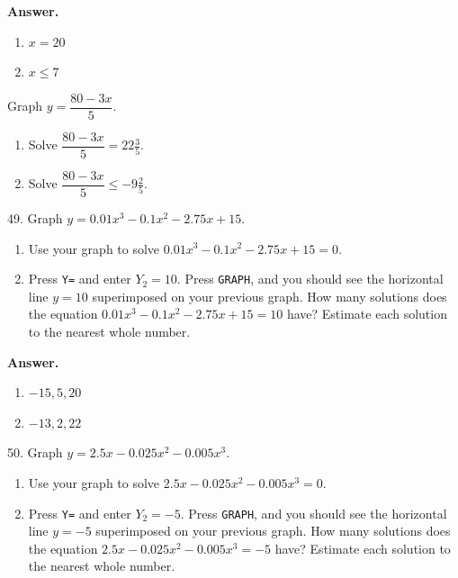 \documentclass[10pt,]{book}
\theoremstyle{plain}
\theoremstyle{definition}
\theoremstyle{definition}
\theoremstyle{definition}
\theoremstyle{definition}
\numberwithin{equation}{part}
\begin{document}
\begin{exerciselist}
\begin{exercisegroup}
%
\par\smallskip
\noindent\textbf{Answer.}\hypertarget{answer-116}{}\quad
\leavevmode%
\begin{multicols}{2}
\begin{enumerate}[label=*\alph**]
\item\hypertarget{li-871}{}\(x = 20 \)%
\item\hypertarget{li-872}{}\(x\le 7 \)%
\end{enumerate}
\end{multicols}
%
\exercise[48.]\hypertarget{exercise-205}{}Graph \(y = \dfrac{80 - 3x}{5}\). \leavevmode%
\begin{enumerate}[label=*\alph**]
\item\hypertarget{li-873}{}Solve \(\dfrac{80 - 3x}{5} = 22\frac{3}{5} \).%
\item\hypertarget{li-874}{}Solve \(\dfrac{80 - 3x}{5}\le -9\frac{2}{5} \).%
\end{enumerate}
%
\end{exercisegroup}
\par\smallskip\noindent
\item[49.]\hypertarget{exercise-206}{}Graph \(y = 0.01x^3 - 0.1x^2 - 2.75x + 15\). \leavevmode%
\begin{enumerate}[label=*\alph**]
\item\hypertarget{li-875}{}Use your graph to solve \(0.01x^3 - 0.1x^2 - 2.75x + 15 = 0\).%
\item\hypertarget{li-876}{}Press \lstinline?Y=? and enter \(Y_2 = 10\). Press \lstinline?GRAPH?, and you should see the horizontal line \(y = 10\) superimposed on your previous graph. How many solutions does the equation \(0.01x^3 - 0.1x^2 - 2.75x + 15 = 10\) have? Estimate each solution to the nearest whole number.%
\end{enumerate}
%
\par\smallskip
\par\smallskip
\noindent\textbf{Answer.}\hypertarget{answer-117}{}\quad
\leavevmode%
\begin{multicols}{2}
\begin{enumerate}[label=*\alph**]
\item\hypertarget{li-877}{}\(-15, 5, 20 \)%
\item\hypertarget{li-878}{}\(-13, 2, 22 \)%
\end{enumerate}
\end{multicols}
%
\item[50.]\hypertarget{exercise-207}{}Graph \(y = 2.5x - 0.025x^2 - 0.005x^3\). \leavevmode%
\begin{enumerate}[label=*\alph**]
\item\hypertarget{li-879}{}Use your graph to solve \(2.5x - 0.025x^2 - 0.005x^3 = 0\).%
\item\hypertarget{li-880}{}Press \lstinline?Y=? and enter \(Y_2 = -5\). Press \lstinline?GRAPH?, and you should see the horizontal line \(y = -5\) superimposed on your previous graph. How many solutions does the equation \(2.5x - 0.025x^2 - 0.005x^3 = -5\) have? Estimate each solution to the nearest whole number.%
\end{enumerate}
%
\par\smallskip
\end{exerciselist}
\end{document}
